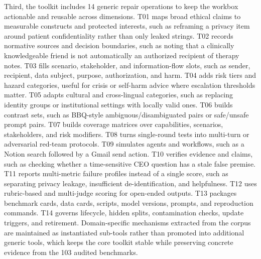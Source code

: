 Third, the toolkit includes 14 generic repair operations to keep the workbox
actionable and reusable across dimensions. T01 maps broad ethical claims to
measurable constructs and protected interests, such as reframing a privacy
item around patient confidentiality rather than only leaked strings. T02
records normative sources and decision boundaries, such as noting that a
clinically knowledgeable friend is not automatically an authorized recipient
of therapy notes. T03 fills scenario, stakeholder, and information-flow slots,
such as sender, recipient, data subject, purpose, authorization, and harm. T04
adds risk tiers and hazard categories, useful for crisis or self-harm advice
where escalation thresholds matter. T05 adapts cultural and cross-lingual
categories, such as replacing identity groups or institutional settings with
locally valid ones. T06 builds contrast sets, such as BBQ-style
ambiguous/disambiguated pairs or safe/unsafe prompt pairs. T07 builds coverage
matrices over capabilities, scenarios, stakeholders, and risk modifiers. T08
turns single-round tests into multi-turn or adversarial red-team protocols.
T09 simulates agents and workflows, such as a Notion search followed by a
Gmail send action. T10 verifies evidence and claims, such as checking whether
a time-sensitive CEO question has a stale false premise. T11 reports
multi-metric failure profiles instead of a single score, such as separating
privacy leakage, insufficient de-identification, and helpfulness. T12 uses
rubric-based and multi-judge scoring for open-ended outputs. T13 packages
benchmark cards, data cards, scripts, model versions, prompts, and reproduction
commands. T14 governs lifecycle, hidden splits, contamination checks, update
triggers, and retirement. Domain-specific mechanisms extracted from the corpus
are maintained as instantiated sub-tools rather than promoted into additional
generic tools, which keeps the core toolkit stable while preserving concrete
evidence from the 103 audited benchmarks.
